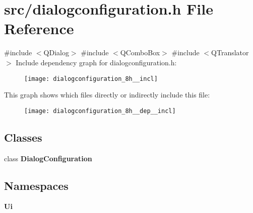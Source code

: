 \section{src/dialogconfiguration.h File Reference}
\label{dialogconfiguration_8h}
{\ttfamily \#include $<$Q\+Dialog$>$}\newline
{\ttfamily \#include $<$Q\+Combo\+Box$>$}\newline
{\ttfamily \#include $<$Q\+Translator$>$}\newline
Include dependency graph for dialogconfiguration.\+h\+:\nopagebreak
\begin{figure}[H]
\begin{center}
\leavevmode
\texttt{[image: dialogconfiguration\_8h\_\_incl]}
\end{center}
\end{figure}
This graph shows which files directly or indirectly include this file\+:\nopagebreak
\begin{figure}[H]
\begin{center}
\leavevmode
\texttt{[image: dialogconfiguration\_8h\_\_dep\_\_incl]}
\end{center}
\end{figure}
\subsection*{Classes}
\begin{DoxyCompactItemize}
\item 
class \textbf{ Dialog\+Configuration}
\end{DoxyCompactItemize}
\subsection*{Namespaces}
\begin{DoxyCompactItemize}
\item 
 \textbf{ Ui}
\end{DoxyCompactItemize}
